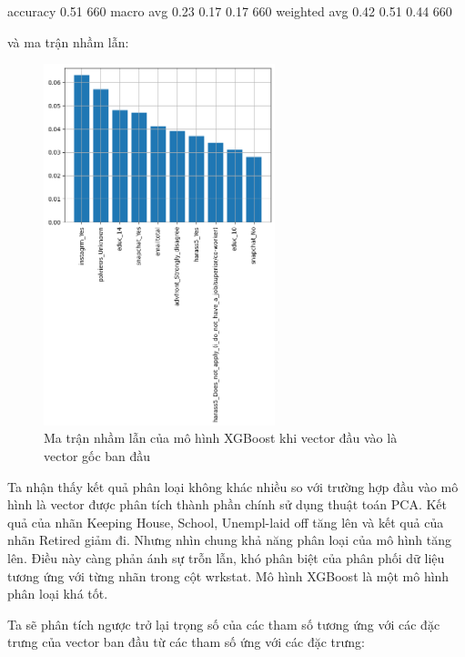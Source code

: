 \begin{enumerate}[label=(\alph*)]
\begin{python}
        accuracy                           0.51       660
       macro avg       0.23      0.17      0.17       660
    weighted avg       0.42      0.51      0.44       660

    \end{python}

    và ma trận nhầm lẫn:

    \begin{figure}[H]
        \centering
        \includegraphics[width=0.6\textwidth]{figures/Thanh/Models/XGBoost/Non_null_models_Feature_Importance_XGBoost_original_features.png}
        \caption{Ma trận nhầm lẫn của mô hình XGBoost khi vector đầu vào là vector gốc ban đầu}
        \label{fig:Non_null_models_Feature_Importance_XGBoost_original_features}
    \end{figure}
    
    Ta nhận thấy kết quả phân loại không khác nhiều so với trường hợp đầu vào mô hình là vector được phân tích thành phần chính sử dụng thuật toán PCA.
    Kết quả của nhãn Keeping House, School, Unempl-laid off tăng lên và kết quả của nhãn Retired giảm đi.
    Nhưng nhìn chung khả năng phân loại của mô hình tăng lên.
    Điều này càng phản ánh sự trỗn lẫn, khó phân biệt của phân phối dữ liệu tương ứng với từng nhãn trong cột wrkstat.
    Mô hình XGBoost là một mô hình phân loại khá tốt.

    Ta sẽ phân tích ngược trở lại trọng số của các tham số tương ứng với các đặc trưng của vector ban đầu từ các tham số ứng với các đặc trưng:


\end{enumerate}
